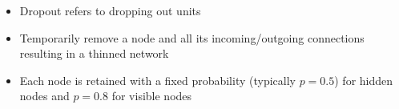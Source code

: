 \documentclass[serif,aspectratio=169]{beamer}
\begin{document}
\begin{frame}
{
	}
	\begin{itemize}
		\item Dropout refers to dropping out units
		\item<2-> Temporarily remove a node and all its incoming/outgoing connections resulting in a thinned network
		\item<3-> Each node is retained with a fixed probability (typically $p=0.5$) for hidden nodes and $p=0.8$ for visible nodes
	\end{itemize}				
\end{frame}
			
\end{document}
